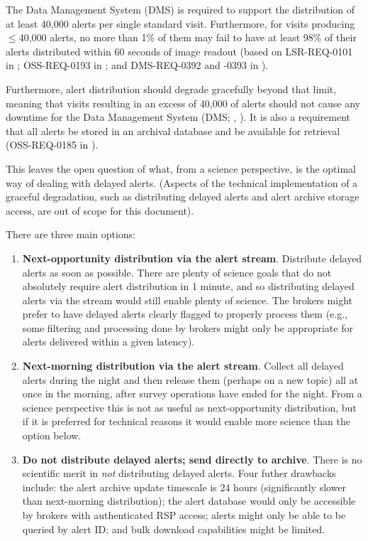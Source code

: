\documentclass[DM,authoryear,toc]{lsstdoc}
\begin{document}
The Data Management System (DMS) is required to support the distribution of at least 40,000 alerts per single standard visit.
Furthermore, for visits producing $\leq$40,000 alerts, no more than 1\% of them may fail to have at least 98\% of their alerts distributed 
within 60 seconds of image readout (based on LSR-REQ-0101 in ; OSS-REQ-0193 in ; 
and DMS-REQ-0392 and -0393 in ).

Furthermore, alert distribution should degrade gracefully beyond that limit, meaning that visits resulting in an excess of 
40,000 of alerts should not cause any downtime for the Data Management System (DMS; , ).
It is also a requirement that all alerts be stored in an archival database and be available for retrieval 
(OSS-REQ-0185 in ).

This leaves the open question of what, from a science perspective, is the optimal way of dealing with delayed alerts.
(Aspects of the technical implementation of a graceful degradation, such as distributing delayed alerts and alert archive 
storage access, are out of scope for this document).

There are three main options:

\begin{enumerate}
\item \textbf{Next-opportunity distribution via the alert stream}.
Distribute delayed alerts as soon as possible.
There are plenty of science goals that do not absolutely require alert distribution in 1 minute, and so distributing delayed 
alerts via the stream would still enable plenty of science.
The brokers might prefer to have delayed alerts clearly flagged to properly process them (e.g., some filtering and processing 
done by brokers might only be appropriate for alerts delivered within a given latency).
\item \textbf{Next-morning distribution via the alert stream}.
Collect all delayed alerts during the night and then release them (perhaps on a new topic) all at once in the morning, after 
survey operations have ended for the night.
From a science perspective this is not as useful as next-opportunity distribution, but if it is preferred for technical 
reasons it would enable more science than the option below.
\item \textbf{Do not distribute delayed alerts; send directly to archive}.
There is no scientific merit in \emph{not} distributing delayed alerts.
Four futher drawbacks include: the alert archive update timescale is 24 hours (significantly slower than next-morning distribution); 
the alert database would only be accessible by brokers with authenticated RSP access; alerts might only be able to be queried by 
alert ID; and bulk download capabilities might be limited.
\end{enumerate}
\end{document}
